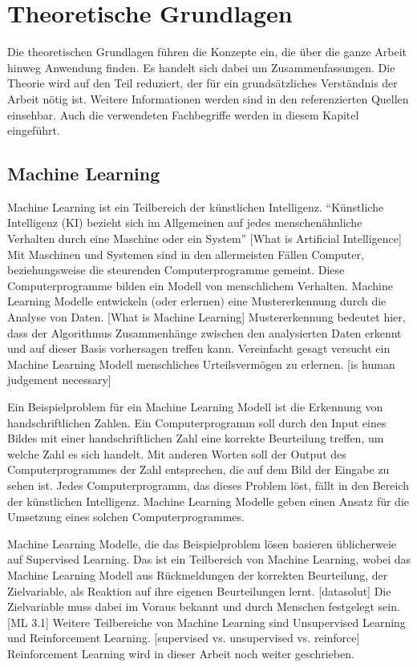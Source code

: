 \chapter{Theoretische Grundlagen}
Die theoretischen Grundlagen führen die Konzepte ein, die über die ganze Arbeit
hinweg Anwendung finden. Es handelt sich dabei um Zusammenfassungen. Die Theorie
wird auf den Teil reduziert, der für ein grundsätzliches Verständnis der Arbeit
nötig ist. Weitere Informationen werden sind in den referenzierten Quellen
einsehbar. Auch die verwendeten Fachbegriffe werden in diesem Kapitel
eingeführt. 

\section{Machine Learning}
\label{chap:t_ml}
Machine Learning ist ein Teilbereich der künstlichen Intelligenz. ``Künstliche
Intelligenz (KI) bezieht sich im Allgemeinen auf jedes menschenähnliche
Verhalten durch eine Maschine oder ein System'' [What is Artificial Intelligence] Mit Maschinen und                
Systemen sind in den allermeisten Fällen Computer, beziehungsweise die
steurenden Computerprogramme gemeint. Diese Computerprogramme bilden ein Modell
von menschlichem Verhalten. Machine Learning Modelle entwickeln (oder erlernen)
eine Mustererkennung durch die Analyse von Daten. [What is Machine Learning]
Mustererkennung bedeutet hier, dass der Algorithmus Zusammenhänge zwischen den
analysierten Daten erkennt und auf dieser Basis vorhersagen treffen kann.
Vereinfacht gesagt versucht ein Machine Learning Modell menschliches
Urteilsvermögen zu erlernen. [is human judgement necessary]

Ein Beispielproblem für ein Machine Learning Modell ist die Erkennung von
handschriftlichen Zahlen. Ein Computerprogramm soll durch den Input eines Bildes
mit einer handschriftlichen Zahl eine korrekte Beurteilung treffen, um welche
Zahl es sich handelt. Mit anderen Worten soll der Output des Computerprogrammes
der Zahl entsprechen, die auf dem Bild der Eingabe zu sehen ist. Jedes
Computerprogramm, das dieses Problem löst, fällt in den Bereich der künstlichen
Intelligenz. Machine Learning Modelle geben einen Ansatz für die Umsetzung eines
solchen Computerprogrammes.

Machine Learning Modelle, die das Beispielproblem lösen basieren üblicherweie
auf Supervised Learning. Das ist ein Teilbereich von Machine Learning, wobei das
Machine Learning Modell aus Rückmeldungen der korrekten Beurteilung, der
Zielvariable, als Reaktion auf ihre eigenen Beurteilungen lernt. [datasolut] Die
Zielvariable muss dabei im Voraus bekannt und durch Menschen festgelegt sein.
[ML 3.1] Weitere Teilbereiche von Machine Learning sind Unsupervised Learning
und Reinforcement Learning. [supervised vs. unsupervised vs. reinforce]
Reinforcement Learning wird in dieser Arbeit noch weiter geschrieben.

